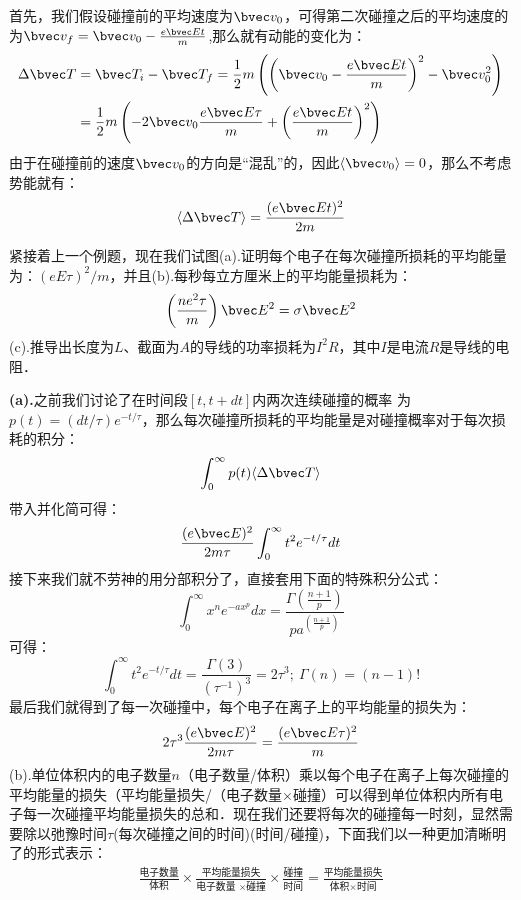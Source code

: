 {\begin{example}{}
首先，我们假设碰撞前的平均速度为$\bvec v_0$，可得第二次碰撞之后的平均速度的为$\bvec v_f=\bvec v_0 -\frac{e\bvec E t}{m}$,那么就有动能的变化为：
\begin{align}
\Delta \bvec T &= \bvec T_i-\bvec T_f=\frac{1}{2}m\left(\left(\bvec v_0 -\frac{e\bvec E t}{m}\right)^2-\bvec v_0^2\right)\\
&=\frac{1}{2}m\left(-2\bvec v_0\frac{e\bvec E \tau}{m}+\left(\frac{e\bvec E t}{m}\right)^2\right)\\
\end{align}
由于在碰撞前的速度$\bvec v_0$的方向是“混乱”的，因此$\langle \bvec v_0\rangle = 0$，那么不考虑势能就有：
\begin{equation}
\langle \Delta \bvec T \rangle = \frac{(e\bvec E t)^2}{2m}
\end{equation}
\end{example}
\begin{exercise}{}
紧接着上一个例题，现在我们试图(a).证明每个电子在每次碰撞所损耗的平均能量为：$(eE\tau)^2/m$，并且(b).每秒每立方厘米上的平均能量损耗为：
\begin{equation}
\left(\frac{ne^2\tau}{m}\right)\bvec E^2=\sigma \bvec E^2
\end{equation}
(c).推导出长度为$L$、截面为$A$的导线的功率损耗为$I^2R$，其中$I$是电流$R$是导线的电阻．

\textbf{(a).}之前我们讨论了在时间段$[t, t + dt]$内两次连续碰撞的概率
为$p(t)=(dt/\tau)e^{- t/\tau}$，那么每次碰撞所损耗的平均能量是对碰撞概率对于每次损耗的积分：
\begin{equation}
\int_0^\infty p(t) \langle\Delta\bvec T\rangle
\end{equation}
带入并化简可得：
\begin{equation}
\frac{(e\bvec E)^2}{2m\tau}\int_0^\infty t^2 e^{- t/\tau}dt
\end{equation}
接下来我们就不劳神的用分部积分了，直接套用下面的特殊积分公式：
\begin{equation}
\int_0^\infty x^n e^{-ax^p}dx = \frac{\Gamma\left(\frac{n+1}{p}\right)}{pa^{\left(\frac{n+1}{p}\right)}}
\end{equation}
可得：
\begin{equation}
\int_0^\infty t^2 e^{- t/\tau}dt=\frac{\Gamma(3)}{(\tau^{-1})^3}=2\tau^3;\ \Gamma(n)=(n-1)!
\end{equation}
最后我们就得到了每一次碰撞中，每个电子在离子上的平均能量的损失为：
\begin{equation}
2\tau^3\frac{(e\bvec E)^2}{2m\tau}=\frac{(e\bvec E\tau)^2}{m}
\end{equation}
(b).单位体积内的电子数量$n$（电子数量/体积）乘以每个电子在离子上每次碰撞的平均能量的损失（平均能量损失/（电子数量$\times$碰撞）可以得到单位体积内所有电子每一次碰撞平均能量损失的总和．现在我们还要将每次的碰撞每一时刻，显然需要除以弛豫时间$\tau$(每次碰撞之间的时间)(时间/碰撞)，下面我们以一种更加清晰明了的形式表示：
\begin{align}
\frac{\mbox{电子数量}}{\mbox{体积}}\times \frac{\mbox{平均能量损失}}{\mbox{电子数量 }\times \mbox{碰撞}}\times\frac{\mbox{碰撞}}{\mbox{时间}}=\frac{\mbox{平均能量损失}}{\mbox{体积}\times \mbox{时间}}
\end{align}


\end{exercise}}
